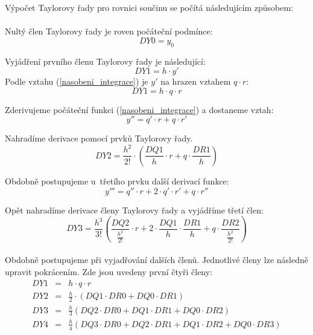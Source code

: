 Výpočet Taylorovy řady pro rovnici součinu se počítá následujícím způsobem:\\\\
Nultý člen Taylorovy řady je roven počáteční podmínce:
\begin{equation}
DY0 = y_0
\end{equation}

Vyjádření prvního členu Taylorovy řady je následující:
\begin{equation}
DY1 = h \cdot y' 
\end{equation}
Podle vztahu (\ref{nasobeni_integrace}) je $y'$ na hrazen vztahem $q \cdot r$:
\begin{equation}
\label{h*q*r}
DY1 = h \cdot q \cdot r
\end{equation}


Zderivujeme počáteční funkci (\ref{nasobeni_integrace}) a dostaneme vztah: 
\begin{equation}
y'' = q' \cdot r + q \cdot r'
\end{equation}

Nahradíme derivace pomocí prvků Taylorovy řady.
\begin{equation}
DY2 = \frac{h^2}{2!} \cdot ( \frac{DQ1}{h} \cdot r + q \cdot \frac{DR1}{h})
\end{equation}

Obdobně postupujeme u~třetího prvku další derivací funkce:
\begin{equation}
y''' = q'' \cdot r + 2 \cdot q' \cdot r' + q \cdot r''
\end{equation}

Opět nahradíme derivace členy Taylorovy řady a vyjádříme třetí člen:
\begin{equation}
DY3 = \frac{h^3}{3!} (\frac{DQ2}{\frac{h^2}{2!}} \cdot r + 2 \cdot \frac{DQ1}{h} \cdot \frac{DR1}{h} + q \cdot \frac{DR2}{\frac{h^2}{2!}})
\end{equation}
\\
Obdobně postupujeme při vyjadřování dalších členů.
Jednotlivé členy lze následně upravit pokrácením. Zde jsou uvedeny první čtyři členy:
\begin{eqnarray}
DY1 &=& h \cdot q \cdot r\\
DY2 &=& \frac{h}{2} \cdot ( DQ1 \cdot DR0 + DQ0 \cdot DR1)\\
DY3 &=& \frac{h}{3} ( DQ2 \cdot DR0 + DQ1 \cdot DR1 + DQ0 \cdot DR2)\\
DY4 &=& \frac{h}{4} (DQ3 \cdot DR0 + DQ2 \cdot DR1 + DQ1 \cdot DR2 + DQ0 \cdot DR3)
\end{eqnarray}

